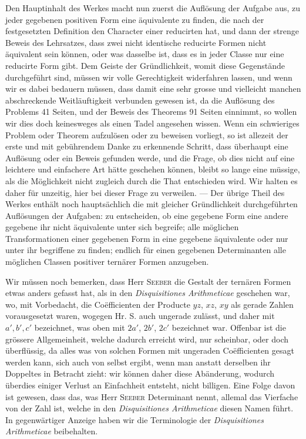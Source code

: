 Den Hauptinhalt des Werkes macht nun zuerst die Auflösung der Aufgabe aus, zu jeder gegebenen positiven Form eine äquivalente zu finden, die nach der festgesetzten Definition den Character einer reducirten hat, und dann der strenge Beweis des Lehrsatzes, dass zwei nicht identische reducirte Formen nicht äquivalent sein können, oder was dasselbe ist, dass es in jeder Classe nur eine reducirte Form gibt. Dem Geiste der Gründlichkeit, womit diese Gegenstände durchgeführt sind, müssen wir volle Gerechtigkeit widerfahren lassen, und wenn wir es dabei bedauern müssen, dass damit eine sehr grosse und vielleicht manchen abschreckende Weitläuftigkeit verbunden gewesen ist, da die Auflösung des Problems 41 Seiten, und der Beweis des Theorems 91 Seiten einnimmt, so wollen wir dies doch keinesweges als einen Tadel angesehen wissen. Wenn ein schwieriges Problem oder Theorem aufzulösen oder zu beweisen vorliegt, so ist allezeit der erste und mit gebührendem Danke zu erkennende Schritt, dass überhaupt eine Auflösung oder ein Beweis gefunden werde, und die Frage, ob dies nicht auf eine leichtere und einfachere Art hätte geschehen können, bleibt so lange eine müssige, als die Möglichkeit nicht zugleich durch die That entschieden wird. Wir halten es daher für unzeitig, hier bei dieser Frage zu verweilen. --- Der übrige Theil des Werkes enthält noch hauptsächlich die mit gleicher Gründlichkeit durchgeführten Auflösungen der Aufgaben: zu entscheiden, ob eine gegebene Form eine andere gegebene ihr nicht äquivalente unter sich begreife; alle möglichen Transformationen einer gegebenen Form in eine gegebene äquivalente oder nur unter ihr begriffene zu finden; endlich für einen gegebenen Determinanten alle möglichen Classen positiver ternärer Formen anzugeben.

Wir müssen noch bemerken, dass Herr \textsc{Seeber} die Gestalt der ternären Formen etwas anders gefasst hat, als in den \emph{Disquisitiones Arithmeticae} geschehen war, wo, mit Vorbedacht, die Coëfficienten der Producte $yz$, $xz$, $xy$ als gerade Zahlen vorausgesetzt waren, wogegen Hr. S. auch ungerade zulässt, und daher
mit $a',b',c'$ bezeichnet, was oben mit $2a'$, $2b'$, $2c'$ bezeichnet war. Offenbar ist die grössere Allgemeinheit, welche dadurch erreicht wird, nur scheinbar, oder doch überflüssig, da alles was von solchen Formen mit ungeraden Coëfficienten gesagt werden kann, sich auch von selbst ergibt, wenn man anstatt derselben ihr Doppeltes in Betracht zieht: wir können daher diese Abänderung, wodurch überdies einiger Verlust an Einfachheit entsteht, nicht billigen. Eine Folge davon ist gewesen, dass das, was Herr \textsc{Seeber} Determinant nennt, allemal das Vierfache von der Zahl ist, welche in den \emph{Disquisitiones Arithmeticae} diesen Namen führt. In gegenwärtiger Anzeige haben wir die Terminologie der \emph{Disquisitiones Arithmeticae} beibehalten.

